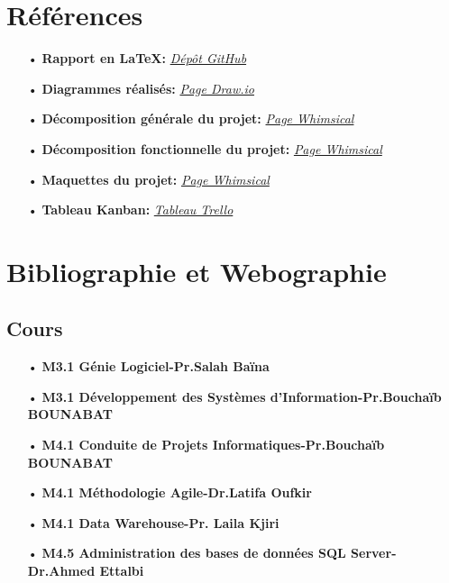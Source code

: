 \documentclass[a4paper]{report}
\begin{document}
\begin{doublespace}
\newpage


\appendix
{} \setcounter{page}{1}
\chapter{Références}

\begin{itemize}
	\item[•] \textbf{Rapport en \LaTeX:} \href{https://github.com/abdorah/stage2021/blob/master/rapport.tex}{\textit{Dépôt GitHub}}
	\item[•] \textbf{Diagrammes réalisés:} \href{https://viewer.diagrams.net/?tags=&highlight=0000ff&edit=_blank&layers=1&nav=1&title=Diagram.drawio#Uhttps%3A%2F%2Fraw.githubusercontent.com%2Fabdorah%2Fstage2021%2Fmaster%2Fdiagramms%2FDiagram.drawio}{\textit{Page Draw.io}}
	\item[•] \textbf{Décomposition générale du projet:} \href{https://whimsical.com/kdi-EkDMmetu6dBHRpCbyDF1yy}{\textit{Page Whimsical}}
	\item[•] \textbf{Décomposition fonctionnelle du projet:} \href{https://whimsical.com/wbs-kpi-9BDZ7oPFWEhvz9qQGoQEdL}\textit{{Page Whimsical}}
	\item[•] \textbf{Maquettes du projet:} \href{https://whimsical.com/kdi-ux-design-J9PD866564ibwyMBwLHN9N}{\textit{Page Whimsical}}
	\item[•] \textbf{Tableau Kanban:} \href{https://trello.com/invite/b/QCUhh5sY/900fa738fc6c66193db04199e1248ae6/suivitransport}{\textit{Tableau Trello}}
\end{itemize}

\chapter{Bibliographie et Webographie}

\section{Cours}

\begin{itemize}
	\item[•] \textbf{M3.1 Génie Logiciel-Pr.Salah Baïna}
	\item[•] \textbf{M3.1 Développement des Systèmes d’Information-Pr.Bouchaïb BOUNABAT}
	\item[•] \textbf{M4.1 Conduite de Projets Informatiques-Pr.Bouchaïb BOUNABAT}
	\item[•] \textbf{M4.1 Méthodologie Agile-Dr.Latifa Oufkir}
	\item[•] \textbf{M4.1 Data Warehouse-Pr. Laila Kjiri}
	\item[•] \textbf{M4.5 Administration des bases de données SQL Server-Dr.Ahmed Ettalbi}
\end{itemize}


\end{doublespace}
\end{document}
